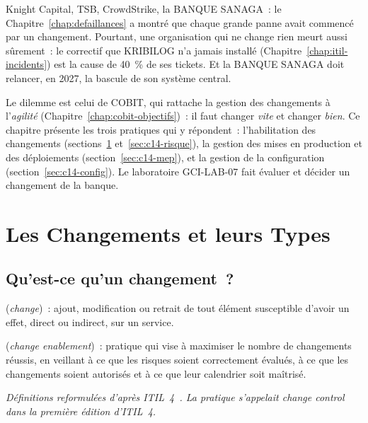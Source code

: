 Knight Capital, TSB, CrowdStrike, la BANQUE SANAGA~: le
Chapitre~\ref{chap:defaillances} a montré que chaque grande panne avait
commencé par un changement. Pourtant, une organisation qui ne change
rien meurt aussi sûrement~: le correctif que KRIBILOG n'a jamais installé
(Chapitre~\ref{chap:itil-incidents}) est la cause de 40~\% de ses tickets.
Et la BANQUE SANAGA doit relancer, en 2027, la bascule de son système
central.

Le dilemme est celui de COBIT, qui rattache la gestion des changements à
l'\emph{agilité} (Chapitre~\ref{chap:cobit-objectifs})~: il faut changer
\emph{vite} et changer \emph{bien}. Ce chapitre présente les trois
pratiques qui y répondent~: l'habilitation des changements
(sections~\ref{sec:c14-types} et~\ref{sec:c14-risque}), la gestion des
mises en production et des déploiements (section~\ref{sec:c14-mep}), et la
gestion de la configuration (section~\ref{sec:c14-config}). Le laboratoire
GCI-LAB-07 fait évaluer et décider un changement de la banque.

\separateur

\section{Les Changements et leurs Types}
\label{sec:c14-types}

\subsection{Qu'est-ce qu'un changement~?}

\begin{boxdef}
 (\textit{change})~: ajout,
modification ou retrait de tout élément susceptible d'avoir un effet,
direct ou indirect, sur un service.

\medskip
{} (\textit{change enablement})~: pratique qui vise à maximiser
le nombre de changements réussis, en veillant à ce que les risques soient
correctement évalués, à ce que les changements soient autorisés et à ce
que leur calendrier soit maîtrisé.
\end{boxdef}
{\small\itshape Définitions reformulées d'après ITIL~4~\cite{axelos2019itil4}.
La pratique s'appelait \emph{change control} dans la première édition
d'ITIL~4.}

